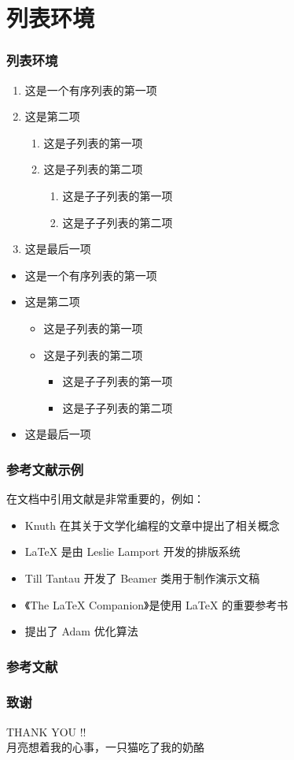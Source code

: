 \documentclass[10pt]{beamer}
\begin{document}
\section{列表环境}
\begin{frame}
\frametitle{列表环境}
\begin{enumerate}
  \item 这是一个有序列表的第一项
  \item 这是第二项
  \begin{enumerate}
    \item 这是子列表的第一项
    \item 这是子列表的第二项
    \begin{enumerate}
      \item 这是子子列表的第一项
      \item 这是子子列表的第二项
    \end{enumerate}
  \end{enumerate}
  \item 这是最后一项
\end{enumerate}

\begin{itemize}
  \item 这是一个有序列表的第一项
  \item 这是第二项
  \begin{itemize}
    \item 这是子列表的第一项
    \item 这是子列表的第二项
    \begin{itemize}
      \item 这是子子列表的第一项
      \item 这是子子列表的第二项
    \end{itemize}
  \end{itemize}
  \item 这是最后一项
\end{itemize}

\end{frame}


\begin{frame}
\frametitle{参考文献示例}
在文档中引用文献是非常重要的，例如：
\begin{itemize}
  \item Knuth 在其关于文学化编程的文章中提出了相关概念~\cite{knuth1984}
  \item LaTeX 是由 Leslie Lamport 开发的排版系统~\cite{lamport1994}
  \item Till Tantau 开发了 Beamer 类用于制作演示文稿~\cite{tantau2004}
  \item 《The LaTeX Companion》是使用 LaTeX 的重要参考书~\cite{mittelbach2004}
  \item 提出了 Adam 优化算法\cite{kingma2017adammethodstochasticoptimization} 
\end{itemize}
\end{frame}

\begin{frame}[allowframebreaks]
\frametitle{参考文献}
\printbibliography[heading=bibliography,title=参考文献]
\end{frame}

\begin{frame}
\frametitle{致谢}
\begin{center}
{\Huge THANK YOU !!}\\[1em]
{\Large 月亮想着我的心事，一只猫吃了我的奶酪}
\end{center}
\end{frame}
\end{document}
